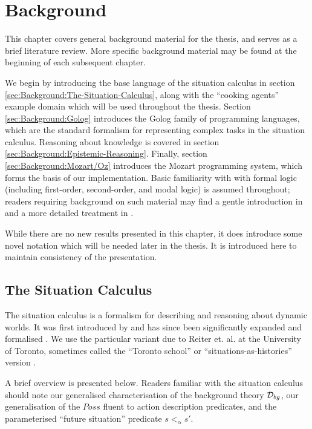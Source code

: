 

\chapter{Background}

\label{ch:background}

This chapter covers general background material for the thesis, and
serves as a brief literature review. More specific background material
may be found at the beginning of each subsequent chapter.

We begin by introducing the base language of the situation calculus
in section \ref{sec:Background:The-Situation-Calculus}, along with
the {}``cooking agents'' example domain which will be used throughout
the thesis. Section \ref{sec:Background:Golog} introduces the Golog
family of programming languages, which are the standard formalism
for representing complex tasks in the situation calculus. Reasoning
about knowledge is covered in section \ref{sec:Background:Epistemic-Reasoning}.
Finally, section \ref{sec:Background:Mozart/Oz} introduces the Mozart
programming system, which forms the basis of our implementation. Basic
familiarity with with formal logic (including first-order, second-order,
and modal logic) is assumed throughout; readers requiring background
on such material may find a gentle introduction in \citep{kelly96logic}
and a more detailed treatment in \citep{fitting96fol_book,blakcburn02modal_logic}.

While there are no new results presented in this chapter, it does
introduce some novel notation which will be needed later in the thesis.
It is introduced here to maintain consistency of the presentation.


\section{The Situation Calculus\label{sec:Background:The-Situation-Calculus}}

The situation calculus is a formalism for describing and reasoning
about dynamic worlds. It was first introduced by \citet{McCHay69sitcalc}
and has since been significantly expanded and formalised \citep{reiter91frameprob,pirri99contributions_sitcalc}.
We use the particular variant due to Reiter et. al. at the University
of Toronto, sometimes called the {}``Toronto school'' or {}``situations-as-histories''
version \citep{levesque98sc_foundations,pirri99contributions_sitcalc}.

A brief overview is presented below. Readers familiar with the situation
calculus should note our generalised characterisation of the background
theory $\mathcal{D}_{bg}$, our generalisation of the $Poss$ fluent to action
description predicates, and the parameterised {}``future situation''
predicate $s<_{\alpha}s'$.


